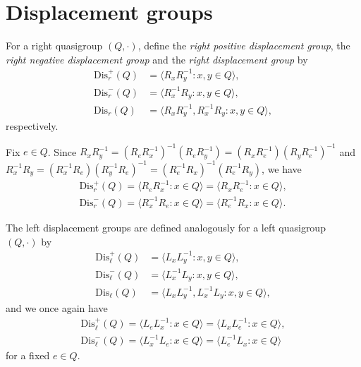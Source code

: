 \documentclass{amsart}
\theoremstyle{plain}
\theoremstyle{definition}
\begin{document}
\section{Displacement groups}

For a right quasigroup $(Q,\cdot)$, define the \emph{right positive displacement group}, the \emph{right negative displacement group} and the \emph{right displacement group} by
\begin{align*}
    \mathrm{Dis}_r^+(Q) &=\langle R_xR_y^{-1}:x,y\in Q\rangle,\\
    \mathrm{Dis}_r^-(Q) &=\langle R_x^{-1}R_y:x,y\in Q\rangle,\\
    \mathrm{Dis}_r(Q) &= \langle R_xR_y^{-1},R_x^{-1}R_y:x,y\in Q\rangle,
\end{align*}
respectively.

Fix $e\in Q$. Since $R_xR_y^{-1} = (R_eR_x^{-1})^{-1}(R_eR_y^{-1}) = (R_xR_e^{-1})(R_yR_e^{-1})^{-1}$ and $R_x^{-1}R_y=(R_x^{-1}R_e)(R_y^{-1}R_e)^{-1} = (R_e^{-1}R_x)^{-1}(R_e^{-1}R_y)$, we have
\begin{align*}
    \mathrm{Dis}_r^+(Q)=\langle R_eR_x^{-1}:x\in Q\rangle = \langle R_xR_e^{-1}:x\in Q\rangle,\\
    \mathrm{Dis}_r^-(Q)=\langle R_x^{-1}R_e:x\in Q\rangle = \langle R_e^{-1}R_x:x\in Q\rangle.
\end{align*}
    
The left displacement groups are defined analogously for a left quasigroup $(Q,\cdot)$ by 
\begin{align*}
    \mathrm{Dis}_\ell^+(Q) &=\langle L_xL_y^{-1}:x,y\in Q\rangle,\\
    \mathrm{Dis}_\ell^-(Q) &=\langle L_x^{-1}L_y:x,y\in Q\rangle,\\
    \mathrm{Dis}_\ell(Q) &= \langle L_xL_y^{-1},L_x^{-1}L_y:x,y\in Q\rangle,    
\end{align*}
and we once again have
\begin{align*}
    \mathrm{Dis}_\ell^+(Q)=\langle L_eL_x^{-1}:x\in Q\rangle = \langle L_xL_e^{-1}:x\in Q\rangle,\\
    \mathrm{Dis}_\ell^-(Q)=\langle L_x^{-1}L_e:x\in Q\rangle = \langle L_e^{-1}L_x:x\in Q\rangle
\end{align*}
for a fixed $e\in Q$.
\end{document}
